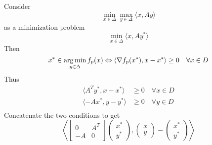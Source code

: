 \documentclass{beamer}
\begin{document}
\begin{frame}
  \frametitle{}
  Consider
  \begin{equation}
      \min_{x \in \Delta} \max_{y \in \Delta} \langle x, Ay \rangle
  \end{equation}
  as a minimization problem
  \begin{equation}
      \min_{x \in \Delta} \langle x, A y^* \rangle
  \end{equation}
  Then
  \begin{equation}
    x^* \in \operatorname*{arg\,min}_{y \in \Delta} f_p(x)  \Leftrightarrow \langle \nabla f_p(x^*), x-x^* \rangle \ge 0 \quad \forall x \in D
  \end{equation}
  Thus
  \begin{equation}
    \begin{aligned}
      \langle A^T y^*, x-x^* \rangle &\ge 0 \quad \forall  x \in D \\
      \langle -A x^*, y-y^* \rangle &\ge 0 \quad \forall  y \in D \\
    \end{aligned}
  \end{equation}
  Concatenate the two conditions to get
  \begin{equation}
  \left\langle \begin{bmatrix}
      0 & A^T \\
      -A & 0
    \end{bmatrix}
    \left(\begin{array}{c}
      x^*\\ y^*
    \end{array}  \right),
    \left(\begin{array}{c}
      x \\ y
    \end{array}  \right)
    -
    \left(\begin{array}{c}
      x^* \\
      y^*
    \end{array} \right)
 \right\rangle
  \end{equation}
\end{frame}
\end{document}
